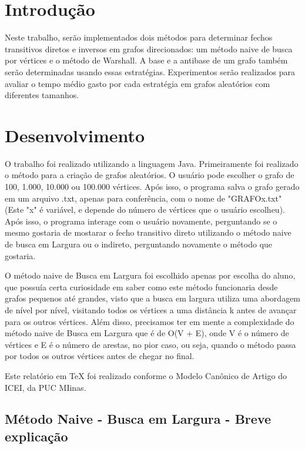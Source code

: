 
\section{\esp Introdução}

Neste trabalho, serão implementados dois métodos para determinar fechos transitivos diretos e inversos em grafos direcionados: um método naive de busca por vértices e o método de Warshall. A base e a antibase de um grafo também serão determinadas usando essas estratégias. Experimentos serão realizados para avaliar o tempo médio gasto por cada estratégia em grafos aleatórios com diferentes tamanhos.

\section{\esp Desenvolvimento}

O trabalho foi realizado utilizando a linguagem Java. Primeiramente foi realizado o método para a criação de grafos aleatórios. O usuário pode escolher o grafo de 100, 1.000, 10.000 ou 100.000 vértices. Após isso, o programa salva o grafo gerado em um arquivo .txt, apenas para conferência, com o nome de "GRAFOx.txt" (Este "x" é variável, e depende do número de vértices que o usuário escolheu). Após isso, o programa interage com o usuário novamente, perguntando se o mesmo gostaria de mostarar o fecho transitivo direto utilizando o método naive de busca em Largura ou o indireto, perguntando novamente o método que gostaria.

O método naive de Busca em Largura foi escolhido apenas por escolha do aluno, que possuía certa curiosidade em saber como este método funcionaria desde grafos pequenos até grandes, visto que a busca em largura utiliza uma abordagem de nível por nível, visitando todos os vértices a uma distância k antes de avançar para os outros vértices. Além disso, precisamos ter em mente a complexidade do método naive de Busca em Largura que é de O(V + E), onde V é o número de vértices e E é o número de arestas, no pior caso, ou seja, quando o método passa por todos os outros vértices antes de chegar no final.

Este relatório em TeX foi realizado conforme o Modelo Canônico de Artigo do ICEI, da PUC MIinas.

\subsection{\esp Método Naive - Busca em Largura - Breve explicação}


